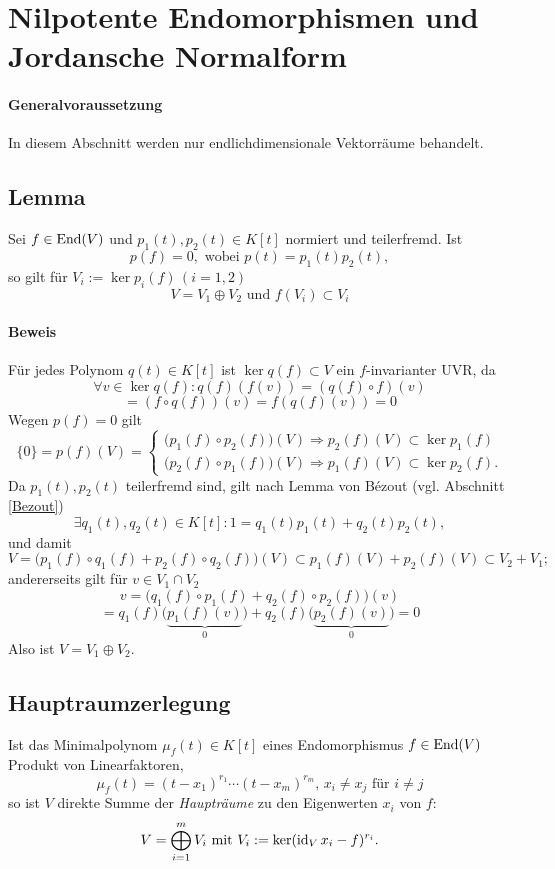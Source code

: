 \section{Nilpotente Endomorphismen und Jordansche Normalform}
\paragraph{Generalvoraussetzung}
	In diesem Abschnitt werden nur endlichdimensionale Vektorräume behandelt.
\subsection{Lemma}
\begin{Lemma}[]
	Sei $ f\in \operatorname{End}(V) $ und $ p_1(t),p_2(t)\in K[t] $ normiert und teilerfremd.
	Ist 
		\[ p(f) = 0, \text{ wobei }p(t) = p_1(t)p_2(t), \]
	so gilt für $ V_i := \ker p_i(f)\, (i=1,2)$
		\[ V=V_1\oplus V_2 \text{ und }f(V_i)\subset V_i \]
\end{Lemma}
\paragraph{Beweis}
	Für jedes Polynom $ q(t)\in K[t] $ ist $ \ker q(f)\subset V $ ein $ f $-invarianter UVR, da
		\[ \forall v\in \ker q(f): q(f)(f(v)) = \left(q(f)\circ f\right)(v) \]
		\[ =\left(f\circ q(f)\right)(v) = f\left(q(f)(v)\right) = 0 \]
	Wegen $ p(f) = 0 $ gilt
		\[ \{0\} = p(f)(V) = 
		\begin{cases}
			\Big(p_1(f)\circ p_2(f)\Big)(V) \Rightarrow p_2(f)(V)\subset \ker p_1(f)\\
			\Big(p_2(f)\circ p_1(f)\Big)(V) \Rightarrow p_1(f)(V)\subset \ker p_2(f).
		\end{cases} \]
	Da $ p_1(t),p_2(t) $ teilerfremd sind, gilt nach Lemma von B\'ezout (vgl. Abschnitt \ref{Bezout})
		\[ \exists q_1(t),q_2(t)\in K[t]: 1= q_1(t)p_1(t)+q_2(t)p_2(t), \]
	und damit
		\[ V= \Big(p_1(f)\circ q_1(f)+p_2(f)\circ q_2(f) \Big)(V)\subset p_1(f)(V)+p_2(f)(V)\subset V_2+V_1; \]
	andererseits gilt für $ v\in V_1\cap V_2 $
		\[ v=\Big(q_1(f)\circ p_1(f)+q_2(f)\circ p_2(f) \Big)(v) \]
		\[ =q_1(f)\Big(\underbrace{p_1(f)(v)}_0\Big)+q_2(f)\Big(\underbrace{p_2(f)(v)}_0\Big) = 0 \]
	Also ist $ V=V_1\oplus V_2 $.
\subsection{Hauptraumzerlegung}
\begin{Satz}[Hauptraumzerlegung]
	Ist das Minimalpolynom $ \mu_f(t)\in K[t] $ eines Endomorphismus $ f\in \operatorname{End}(V) $ Produkt von Linearfaktoren,
		\[ \mu_f(t) = (t-x_1)^{r_1}\cdots (t-x_m)^{r_m},\, x_i\neq x_j \text{ für }i\neq j \]
	so ist $ V $ direkte Summe der \emph{Haupträume} zu den Eigenwerten $ x_i $ von $ f $:
		\[ V=\bigoplus_{i=1}^m V_i \text{ mit }V_i := \ker (\operatorname{id}_Vx_i-f)^{r_i}. \]
\end{Satz}
